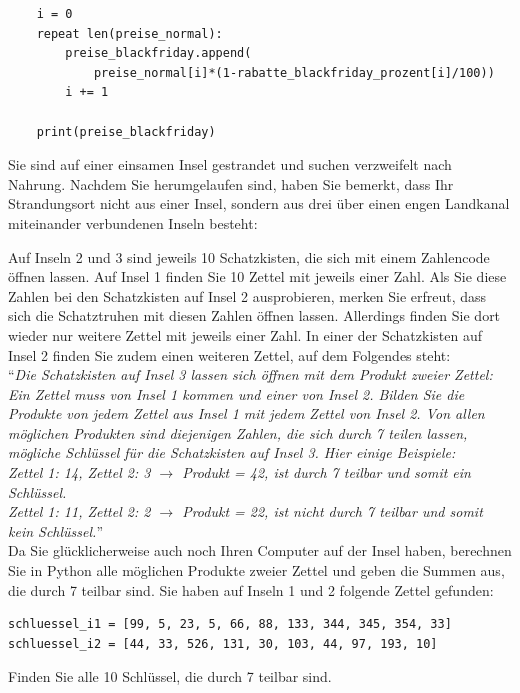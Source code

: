 \begin{questions}
\begin{solution}
\begin{lstlisting}
    i = 0
    repeat len(preise_normal):
        preise_blackfriday.append(
            preise_normal[i]*(1-rabatte_blackfriday_prozent[i]/100))
        i += 1

    print(preise_blackfriday)
    \end{lstlisting}
	\end{solution}

\clearpage
{}

Sie sind auf einer einsamen Insel gestrandet und suchen verzweifelt nach Nahrung. Nachdem Sie herumgelaufen sind, haben Sie bemerkt, dass Ihr Strandungsort nicht aus einer Insel, sondern aus drei über einen engen Landkanal miteinander verbundenen Inseln besteht:
\begin{figure}[H]
	\centering
\end{figure}
Auf Inseln 2 und 3 sind jeweils 10 Schatzkisten, die sich mit einem Zahlencode öffnen lassen. Auf Insel 1 finden Sie 10 Zettel mit jeweils einer Zahl. Als Sie diese Zahlen bei den Schatzkisten auf Insel 2 ausprobieren, merken Sie erfreut, dass sich die Schatztruhen mit diesen Zahlen öffnen lassen. Allerdings finden Sie dort wieder nur weitere Zettel mit jeweils einer Zahl. In einer der Schatzkisten auf Insel 2 finden Sie zudem einen weiteren Zettel, auf dem Folgendes steht:\\

``\textit{Die Schatzkisten auf Insel 3 lassen sich öffnen mit dem Produkt zweier Zettel: Ein Zettel muss von Insel 1 kommen und einer von Insel 2. Bilden Sie die Produkte von jedem Zettel aus Insel 1 mit jedem Zettel von Insel 2. Von allen möglichen Produkten sind diejenigen Zahlen, die sich durch 7 teilen lassen, mögliche Schlüssel für die Schatzkisten auf Insel 3. Hier einige Beispiele:\\
Zettel 1: 14, Zettel 2: 3 $\rightarrow$ Produkt = 42, ist durch 7 teilbar und somit ein Schlüssel.\\
Zettel 1: 11, Zettel 2: 2 $\rightarrow$ Produkt = 22, ist nicht durch 7 teilbar und somit kein Schlüssel.}''\\

Da Sie glücklicherweise auch noch Ihren Computer auf der Insel haben, berechnen Sie in Python alle möglichen Produkte zweier Zettel und geben die Summen aus, die durch 7 teilbar sind. Sie haben auf Inseln 1 und 2 folgende Zettel gefunden:
\begin{lstlisting}
schluessel_i1 = [99, 5, 23, 5, 66, 88, 133, 344, 345, 354, 33]
schluessel_i2 = [44, 33, 526, 131, 30, 103, 44, 97, 193, 10]
\end{lstlisting}
Finden Sie alle 10 Schlüssel, die durch 7 teilbar sind.


\end{questions}
